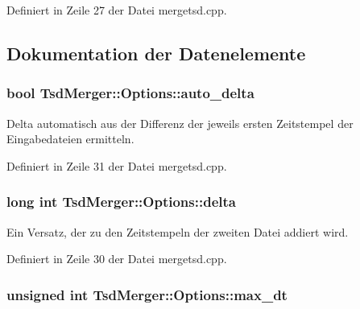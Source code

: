 Definiert in Zeile 27 der Datei mergetsd.\-cpp.



\subsection{Dokumentation der Datenelemente}
\hypertarget{structTsdMerger_1_1Options_a34cacae19241161f15637c7fcab5ac0a}{
\subsubsection[{auto\-\_\-delta}]{\setlength{\rightskip}{0pt plus 5cm}bool Tsd\-Merger\-::\-Options\-::auto\-\_\-delta}}\label{structTsdMerger_1_1Options_a34cacae19241161f15637c7fcab5ac0a}


Delta automatisch aus der Differenz der jeweils ersten Zeitstempel der Eingabedateien ermitteln. 



Definiert in Zeile 31 der Datei mergetsd.\-cpp.

\hypertarget{structTsdMerger_1_1Options_ac64f16f7048749aceb1f3368344ea8a8}{
\subsubsection[{delta}]{\setlength{\rightskip}{0pt plus 5cm}long int Tsd\-Merger\-::\-Options\-::delta}}\label{structTsdMerger_1_1Options_ac64f16f7048749aceb1f3368344ea8a8}


Ein Versatz, der zu den Zeitstempeln der zweiten Datei addiert wird. 



Definiert in Zeile 30 der Datei mergetsd.\-cpp.

\hypertarget{structTsdMerger_1_1Options_aa8403cbade9ca78ab6f5be07ad270c15}{
\subsubsection[{max\-\_\-dt}]{\setlength{\rightskip}{0pt plus 5cm}unsigned int Tsd\-Merger\-::\-Options\-::max\-\_\-dt}}\label{structTsdMerger_1_1Options_aa8403cbade9ca78ab6f5be07ad270c15}


